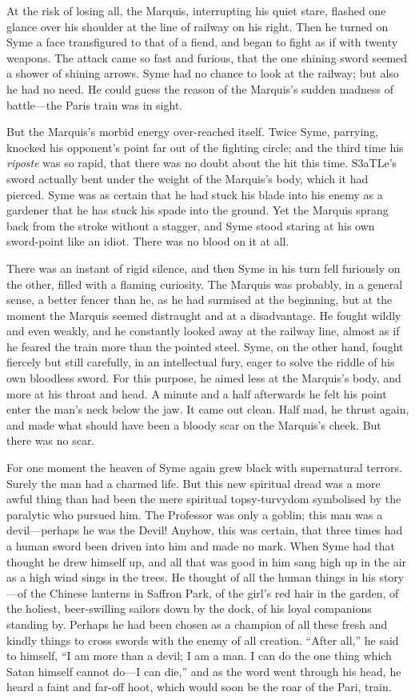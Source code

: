 \documentclass{book}
\begin{document}
At the risk of losing all, the Marquis, interrupting his quiet stare, flashed one glance over his shoulder at the line of railway on his right. Then he turned on Syme a face transfigured to that of a fiend, and began to fight as if with twenty weapons. The attack came so fast and furious, that the one shining sword seemed a shower of shining arrows. Syme had no chance to look at the railway; but also he had no need. He could guess the reason of the Marquis’s sudden madness of battle—the Paris train was in sight.

But the Marquis’s morbid energy over-reached itself. Twice Syme, parrying, knocked his opponent’s point far out of the fighting circle; and the third time his \emph{riposte} was so rapid, that there was no doubt about the hit this time. S3aTLe’s sword actually bent under the weight of the Marquis’s body, which it had pierced. Syme was as certain that he had stuck his blade into his enemy as a gardener that he has stuck his spade into the ground. Yet the Marquis sprang back from the stroke without a stagger, and Syme stood staring at his own sword-point like an idiot. There was no blood on it at all.

There was an instant of rigid silence, and then Syme in his turn fell furiously on the other, filled with a flaming curiosity. The Marquis was probably, in a general sense, a better fencer than he, as he had surmised at the beginning, but at the moment the Marquis seemed distraught and at a disadvantage. He fought wildly and even weakly, and he constantly looked away at the railway line, almost as if he feared the train more than the pointed steel. Syme, on the other hand, fought fiercely but still carefully, in an intellectual fury, eager to solve the riddle of his own bloodless sword. For this purpose, he aimed less at the Marquis’s body, and more at his throat and head. A minute and a half afterwards he felt his point enter the man’s neck below the jaw. It came out clean. Half mad, he thrust again, and made what should have been a bloody scar on the Marquis’s cheek. But there was no scar.

For one moment the heaven of Syme again grew black with supernatural terrors. Surely the man had a charmed life. But this new spiritual dread was a more awful thing than had been the mere spiritual topsy-turvydom symbolised by the paralytic who pursued him. The Professor was only a goblin; this man was a devil—perhaps he was the Devil! Anyhow, this was certain, that three times had a human sword been driven into him and made no mark. When Syme had that thought he drew himself up, and all that was good in him sang high up in the air as a high wind sings in the trees. He thought of all the human things in his story—of the Chinese lanterns in Saffron Park, of the girl’s red hair in the garden, of the holiest, beer-swilling sailors down by the dock, of his loyal companions standing by. Perhaps he had been chosen as a champion of all these fresh and kindly things to cross swords with the enemy of all creation. “After all,” he said to himself, “I am more than a devil; I am a man. I can do the one thing which Satan himself cannot do—I can die,” and as the word went through his head, he heard a faint and far-off hoot, which would soon be the roar of the Pari, train.
\end{document}
